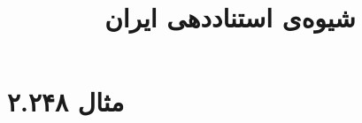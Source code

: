 \documentclass[a4paper,10pt]{article}
\begin{document}
\title{شیوه‌ی استناددهی ایران}
\author{}
\date{}
\maketitle



\section*{مثال ۲.۲۴۸}

\cite{شیرازی1385}\\
\begin{latin}\noindent
\cite{uscensus2000}\\
\end{latin}






\end{document}
